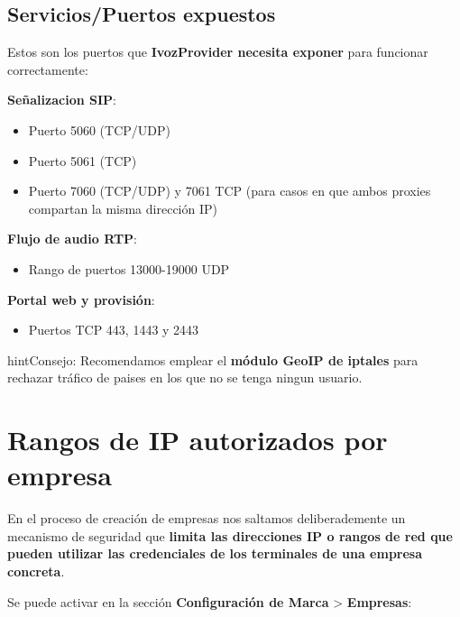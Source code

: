 \documentclass[letterpaper,10pt,spanish]{sphinxmanual}
\begin{document}
\subsection{Servicios/Puertos expuestos}
\label{security/index:exposed-ports-services}
Estos son los puertos que \textbf{IvozProvider necesita exponer} para funcionar correctamente:

\textbf{Señalizacion SIP}:
\begin{itemize}
\item {} 
Puerto 5060 (TCP/UDP)

\item {} 
Puerto 5061 (TCP)

\item {} 
Puerto 7060 (TCP/UDP) y 7061 TCP (para casos en que ambos proxies compartan la misma dirección IP)

\end{itemize}

\textbf{Flujo de audio RTP}:
\begin{itemize}
\item {} 
Rango de puertos 13000-19000 UDP

\end{itemize}

\textbf{Portal web y provisión}:
\begin{itemize}
\item {} 
Puertos TCP 443, 1443 y 2443

\end{itemize}

\begin{notice}{hint}{Consejo:}
Recomendamos emplear el \textbf{módulo GeoIP de iptales} para rechazar tráfico de paises en los que no se tenga ningun usuario.
\end{notice}


\section{Rangos de IP autorizados por empresa}
\label{security/index:authorized-company-ip-ranges}
En el proceso de creación de empresas nos saltamos deliberademente un mecanismo de seguridad que \textbf{limita las direcciones IP o rangos de red que pueden utilizar las credenciales de los terminales de una empresa concreta}.

Se puede activar en la sección \textbf{Configuración de Marca} \textgreater{} \textbf{Empresas}:

\end{document}
